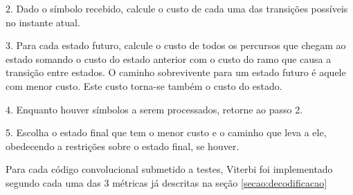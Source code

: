 2. Dado o símbolo recebido, calcule o custo de cada uma das transições possíveis no instante atual.

3. Para cada estado futuro, calcule o custo de todos os percursos que chegam ao estado somando o custo do estado anterior com o custo do ramo que causa a transição entre estados. O caminho sobrevivente para um estado futuro é aquele com menor custo. Este custo torna-se também o custo do estado.

4. Enquanto houver símbolos a serem processados, retorne ao passo 2.

5. Escolha o estado final que tem o menor custo e o caminho que leva a ele, obedecendo a restrições sobre o estado final, se houver.

Para cada código convolucional submetido a testes, Viterbi foi implementado segundo cada uma das 3 métricas já descritas na seção \ref{secao:decodificacao}